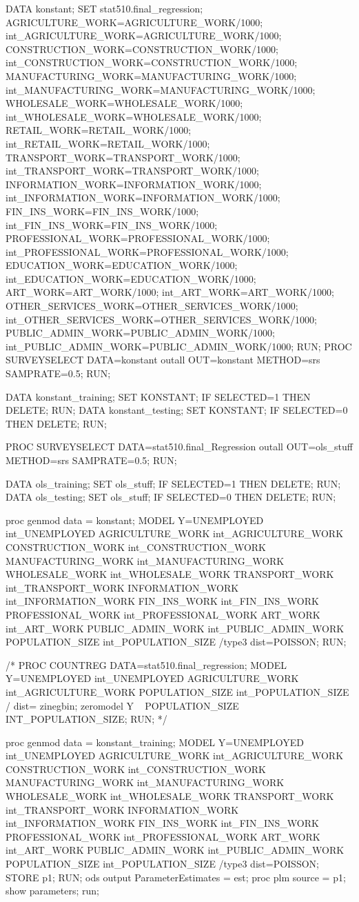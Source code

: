 \begin{SAScode}
DATA konstant;
SET stat510.final_regression;
AGRICULTURE_WORK=AGRICULTURE_WORK/1000;
int_AGRICULTURE_WORK=AGRICULTURE_WORK/1000;
CONSTRUCTION_WORK=CONSTRUCTION_WORK/1000;
int_CONSTRUCTION_WORK=CONSTRUCTION_WORK/1000;
MANUFACTURING_WORK=MANUFACTURING_WORK/1000;
int_MANUFACTURING_WORK=MANUFACTURING_WORK/1000;
WHOLESALE_WORK=WHOLESALE_WORK/1000;
int_WHOLESALE_WORK=WHOLESALE_WORK/1000;
RETAIL_WORK=RETAIL_WORK/1000;
int_RETAIL_WORK=RETAIL_WORK/1000;
TRANSPORT_WORK=TRANSPORT_WORK/1000;
int_TRANSPORT_WORK=TRANSPORT_WORK/1000;
INFORMATION_WORK=INFORMATION_WORK/1000;
int_INFORMATION_WORK=INFORMATION_WORK/1000;
FIN_INS_WORK=FIN_INS_WORK/1000;
int_FIN_INS_WORK=FIN_INS_WORK/1000;
PROFESSIONAL_WORK=PROFESSIONAL_WORK/1000;
int_PROFESSIONAL_WORK=PROFESSIONAL_WORK/1000;
EDUCATION_WORK=EDUCATION_WORK/1000;
int_EDUCATION_WORK=EDUCATION_WORK/1000;
ART_WORK=ART_WORK/1000;
int_ART_WORK=ART_WORK/1000;
OTHER_SERVICES_WORK=OTHER_SERVICES_WORK/1000;
int_OTHER_SERVICES_WORK=OTHER_SERVICES_WORK/1000;
PUBLIC_ADMIN_WORK=PUBLIC_ADMIN_WORK/1000;
int_PUBLIC_ADMIN_WORK=PUBLIC_ADMIN_WORK/1000;
RUN;
PROC SURVEYSELECT DATA=konstant outall OUT=konstant METHOD=srs SAMPRATE=0.5;
RUN;

DATA konstant_training;
SET KONSTANT;
IF SELECTED=1 THEN DELETE;
RUN;
DATA konstant_testing;
SET KONSTANT;
IF SELECTED=0 THEN DELETE;
RUN;


PROC SURVEYSELECT DATA=stat510.final_Regression outall OUT=ols_stuff METHOD=srs SAMPRATE=0.5;
RUN;

DATA ols_training;
SET ols_stuff;
IF SELECTED=1 THEN DELETE;
RUN;
DATA ols_testing;
SET ols_stuff;
IF SELECTED=0 THEN DELETE;
RUN;

proc genmod data = konstant;
MODEL Y=UNEMPLOYED int_UNEMPLOYED
AGRICULTURE_WORK int_AGRICULTURE_WORK
CONSTRUCTION_WORK int_CONSTRUCTION_WORK
MANUFACTURING_WORK int_MANUFACTURING_WORK
WHOLESALE_WORK int_WHOLESALE_WORK
TRANSPORT_WORK int_TRANSPORT_WORK
INFORMATION_WORK int_INFORMATION_WORK
FIN_INS_WORK int_FIN_INS_WORK
PROFESSIONAL_WORK int_PROFESSIONAL_WORK
ART_WORK int_ART_WORK
PUBLIC_ADMIN_WORK int_PUBLIC_ADMIN_WORK
POPULATION_SIZE int_POPULATION_SIZE
/type3 dist=POISSON;
RUN;

/*
PROC COUNTREG DATA=stat510.final_regression;
MODEL Y=UNEMPLOYED int_UNEMPLOYED
AGRICULTURE_WORK int_AGRICULTURE_WORK
POPULATION_SIZE int_POPULATION_SIZE
/ dist= zinegbin;
  zeromodel Y ~ POPULATION_SIZE INT_POPULATION_SIZE;
RUN;
*/



proc genmod data = konstant_training;
MODEL Y=UNEMPLOYED int_UNEMPLOYED
AGRICULTURE_WORK int_AGRICULTURE_WORK
CONSTRUCTION_WORK int_CONSTRUCTION_WORK
MANUFACTURING_WORK int_MANUFACTURING_WORK
WHOLESALE_WORK int_WHOLESALE_WORK
TRANSPORT_WORK int_TRANSPORT_WORK
INFORMATION_WORK int_INFORMATION_WORK
FIN_INS_WORK int_FIN_INS_WORK
PROFESSIONAL_WORK int_PROFESSIONAL_WORK
ART_WORK int_ART_WORK
PUBLIC_ADMIN_WORK int_PUBLIC_ADMIN_WORK
POPULATION_SIZE int_POPULATION_SIZE
/type3 dist=POISSON;
STORE p1;
RUN;
ods output ParameterEstimates = est;
proc plm source = p1;
  show parameters;
run;


\end{SAScode}
